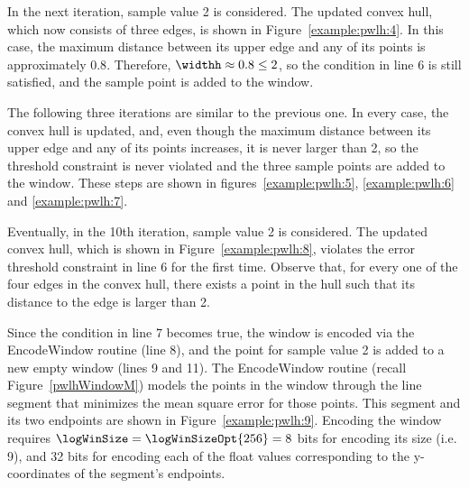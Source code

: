 

In the next iteration, sample value 2 is considered. The updated convex hull, which now consists of three edges, is shown in Figure~\ref{example:pwlh:4}. In this case, the maximum distance between its upper edge and any of its points is approximately $0.8$. Therefore, $\widthh \approx 0.8 \leq 2$, so the condition in line 6 is still satisfied, and the sample point is added to the window.




\clearpage


The following three iterations are similar to the previous one. In every case, the convex hull is updated, and, even though the maximum distance between its upper edge and any of its points increases, it is never larger than 2, so the threshold constraint is never violated and the three sample points are added to the window. These steps are shown in figures~\ref{example:pwlh:5}, \ref{example:pwlh:6} and \ref{example:pwlh:7}. 




\clearpage




Eventually, in the 10th iteration, sample value 2 is considered. The updated convex hull, which is shown in Figure~\ref{example:pwlh:8}, violates the error threshold constraint in line 6 for the first time. Observe that, for every one of the four edges in the convex hull, there exists a point in the hull such that its distance to the edge is larger than 2. 




\clearpage


Since the condition in line 7 becomes true, the window is encoded via the EncodeWindow routine (line 8), and the point for sample value 2 is added to a new empty window (lines 9 and 11). The EncodeWindow routine (recall Figure~\ref{pwlhWindowM}) models the points in the window through the line segment that minimizes the mean square error for those points. This segment and its two endpoints are shown in Figure~\ref{example:pwlh:9}. Encoding the window requires $\logWinSize = \logWinSizeOpt{256}=8$ bits for encoding its size (i.e. 9), and 32 bits for encoding each of the float values corresponding to the y-coordinates of the segment's endpoints.


